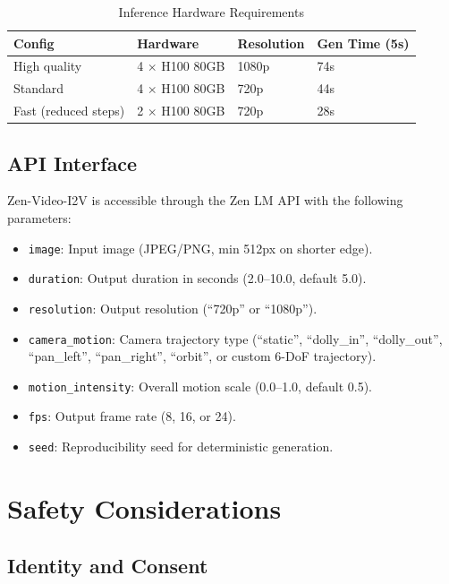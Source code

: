 \documentclass[11pt,a4paper]{article}
\begin{document}
\begin{table}[H]
\centering
\caption{Inference Hardware Requirements}
\begin{tabular}{llll}
\toprule
\textbf{Config} & \textbf{Hardware} & \textbf{Resolution} & \textbf{Gen Time (5s)} \\
\midrule
High quality & 4 $\times$ H100 80GB & 1080p & 74s \\
Standard & 4 $\times$ H100 80GB & 720p & 44s \\
Fast (reduced steps) & 2 $\times$ H100 80GB & 720p & 28s \\
\bottomrule
\end{tabular}
\end{table}

\subsection{API Interface}

Zen-Video-I2V is accessible through the Zen LM API with the following parameters:

\begin{itemize}
  \item \texttt{image}: Input image (JPEG/PNG, min 512px on shorter edge).
  \item \texttt{duration}: Output duration in seconds (2.0--10.0, default 5.0).
  \item \texttt{resolution}: Output resolution (``720p'' or ``1080p'').
  \item \texttt{camera\_motion}: Camera trajectory type (``static'', ``dolly\_in'', ``dolly\_out'', ``pan\_left'', ``pan\_right'', ``orbit'', or custom 6-DoF trajectory).
  \item \texttt{motion\_intensity}: Overall motion scale (0.0--1.0, default 0.5).
  \item \texttt{fps}: Output frame rate (8, 16, or 24).
  \item \texttt{seed}: Reproducibility seed for deterministic generation.
\end{itemize}

\section{Safety Considerations}

\subsection{Identity and Consent}
\end{document}
